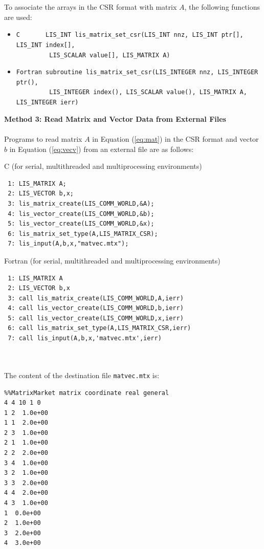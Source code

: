 \documentclass[a4paper]{article}
\begin{document}
To associate the arrays in the CSR format with matrix $A$, the following functions are used:
\begin{itemize}
\item \verb|C       LIS_INT lis_matrix_set_csr(LIS_INT nnz, LIS_INT ptr[], LIS_INT index[],|\\
      \verb|         LIS_SCALAR value[], LIS_MATRIX A)|
\item \verb|Fortran subroutine lis_matrix_set_csr(LIS_INTEGER nnz, LIS_INTEGER ptr(),|\\
      \verb|         LIS_INTEGER index(), LIS_SCALAR value(), LIS_MATRIX A, LIS_INTEGER ierr)|
\end{itemize}
\vspace*{5mm}

\noindent
{\bf Method 3: Read Matrix and Vector Data from External Files}\\
\\ \indent
Programs to read matrix $A$ in Equation (\ref{eq:mat}) in the CSR format and 
vector $b$ in Equation (\ref{eq:vecv}) from an external file are as follows: 
\\
\begin{itembox}[l]{C (for serial, multithreaded and multiprocessing environments)}
\small
\begin{verbatim}
 1: LIS_MATRIX A;
 2: LIS_VECTOR b,x;
 3: lis_matrix_create(LIS_COMM_WORLD,&A); 
 4: lis_vector_create(LIS_COMM_WORLD,&b); 
 5: lis_vector_create(LIS_COMM_WORLD,&x); 
 6: lis_matrix_set_type(A,LIS_MATRIX_CSR); 
 7: lis_input(A,b,x,"matvec.mtx"); 
\end{verbatim}
\end{itembox}
\begin{itembox}[l]{Fortran (for serial, multithreaded and multiprocessing environments)}
\small
\begin{verbatim}
 1: LIS_MATRIX A
 2: LIS_VECTOR b,x
 3: call lis_matrix_create(LIS_COMM_WORLD,A,ierr) 
 4: call lis_vector_create(LIS_COMM_WORLD,b,ierr) 
 5: call lis_vector_create(LIS_COMM_WORLD,x,ierr) 
 6: call lis_matrix_set_type(A,LIS_MATRIX_CSR,ierr) 
 7: call lis_input(A,b,x,'matvec.mtx',ierr) 
\end{verbatim}
\end{itembox}
\\ \\
The content of the destination file {\tt matvec.mtx} is:
{\small
\begin{verbatim}
%%MatrixMarket matrix coordinate real general
4 4 10 1 0
1 2  1.0e+00
1 1  2.0e+00
2 3  1.0e+00
2 1  1.0e+00
2 2  2.0e+00
3 4  1.0e+00
3 2  1.0e+00
3 3  2.0e+00
4 4  2.0e+00
4 3  1.0e+00
1  0.0e+00
2  1.0e+00
3  2.0e+00
4  3.0e+00
\end{verbatim}
}
\end{document}

